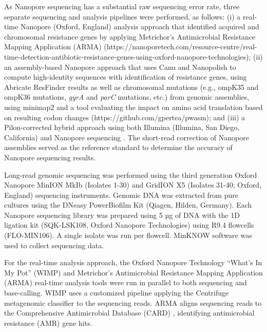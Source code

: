 As Nanopore sequencing has a substantial raw sequencing error rate, three separate sequencing and analysis pipelines were performed, as follows: (i) a real-time Nanopore (Oxford, England) analysis approach that identified acquired and chromosomal resistance genes by applying Metrichor’s Antimicrobial Resistance Mapping Application (ARMA) (https://nanoporetech.com/resource-centre/real-time-detection-antibiotic-resistance-genes-using-oxford-nanopore-technologies); (ii) an assembly-based Nanopore approach that uses Canu and Nanopolish \citep{Loman2015-nf, Koren2017-wf} to compute high-identity sequences with identification of resistance genes, using Abricate ResFinder results as well as chromosomal mutations (e.g., ompK35 and ompK36 mutations, \textit{gyrA} and \textit{parC} mutations, etc.) from genomic assemblies, using minimap2 \citep{Li2018-eq} and a tool evaluating the impact on amino acid translation based on resulting codon changes (https://github.com/gpertea/pwasm); and (iii) a Pilon-corrected hybrid approach using both Illumina (Illumina, San Diego, California) and Nanopore sequencing \citep{Walker2014-eh}. The short-read correction of Nanopore assemblies served as the reference standard to determine the accuracy of Nanopore sequencing results.

Long-read genomic sequencing was performed using the third generation Oxford Nanopore MinION MkIb (Isolates 1-30) and GridION X5 (Isolates 31-40; Oxford, England) sequencing instruments. Genomic DNA was extracted from pure cultures using the DNeasy PowerBiofilm Kit (Qiagen, Hilden, Germany). Each Nanopore sequencing library was prepared using 5 µg of DNA with the 1D ligation kit (SQK-LSK108, Oxford Nanopore Technologies) using R9.4 flowcells (FLO-MIN106). A single isolate was run per flowcell. MinKNOW software was used to collect sequencing data.

For the real-time analysis approach, the Oxford Nanopore Technology “What’s In My Pot” (WIMP) \citep{Juul2015-zt} and Metrichor’s Antimicrobial Resistance Mapping Application (ARMA) real-time analysis tools were run in parallel to both sequencing and base-calling. WIMP uses a customized pipeline applying the Centrifuge metagenomic classifier to the sequencing reads. ARMA aligns sequencing reads to the Comprehensive Antimicrobial
Database (CARD) \citep{Jia2017-pg}, identifying antimicrobial resistance (AMR) gene hits.

